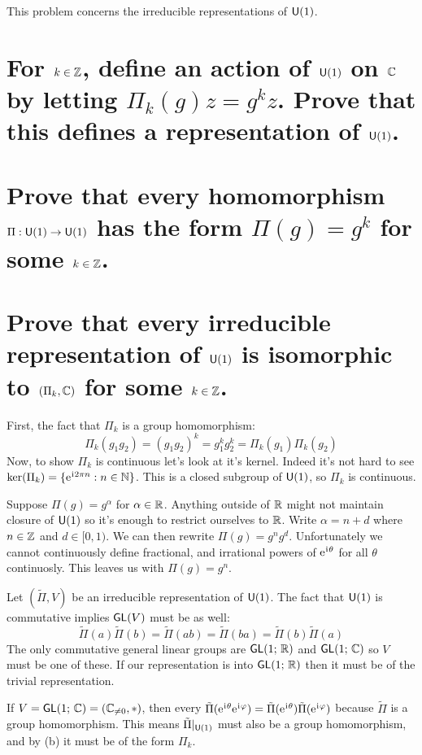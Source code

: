 \documentclass[
	pages,
	boxes,
	color=WildStrawberry
]{homework}
\begin{document}
\begin{problem}
This problem concerns the irreducible representations of $\mathsf{U}(1)$.
\begin{parts}
	\part{For $k \in \mathbb{Z}$, define an action of $\mathsf{U}(1)$ on $\mathbb{C}$ by letting $\Pi_k(g) z = g^k z$. Prove that this defines a representation of $\mathsf{U}(1)$.}\label{part:7a}
	\part{Prove that every homomorphism $\Pi: \mathsf{U}(1) \to \mathsf{U}(1)$ has the form $\Pi(g) = g^k$ for some $k \in \mathbb{Z}$.}\label{part:7b}
	\part{Prove that every irreducible representation of $\mathsf{U}(1)$ is isomorphic to $(\Pi_k, \mathbb{C})$ for some $k \in \mathbb{Z}$.}\label{part:7c}
\end{parts}
\end{problem}

\begin{solution}
	\ref{part:7a}
	First, the fact that $\Pi_k$ is a group homomorphism:
	\begin{equation*}
		\Pi_k(g_1 g_2) = (g_1 g_2)^k = g_1^k g_2^k = \Pi_k(g_1)\Pi_k(g_2)
	\end{equation*}
	Now, to show $\Pi_k$ is continuous let's look at it's kernel. Indeed it's not hard to see $\ker(\Pi_k) = \{\mathrm{e}^{\mkern1mu\mathrm{i}\mkern1mu 2\pi n} : n\in \mathbb{N} \}$. This is a closed subgroup of $\mathsf{U}(1)$, so $\Pi_k$ is continuous.

	\ref{part:7b}
	Suppose $\Pi(g) = g^\alpha$ for $\alpha\in\mathbb{R}$. Anything outside of $\mathbb{R}$ might not maintain closure of $\mathsf{U}(1)$ so it's enough to restrict ourselves to $\mathbb{R}$. Write $\alpha = n + d$ where $n\in\mathbb{Z}$ and $d\in[0, 1)$. We can then rewrite $\Pi(g) = g^n g^d$. Unfortunately we cannot continuously define fractional, and irrational powers of $\mathrm{e}^{\mkern1mu\mathrm{i}\mkern1mu \theta}$ for all $\theta$ continuosly. This leaves us with $\Pi(g) = g^n$.

	\ref{part:7c}
	Let $(\tilde{\Pi}, V)$ be an irreducible representation of $\mathsf{U}(1)$. The fact that $\mathsf{U}(1)$ is commutative implies $\mathsf{GL}(V)$ must be as well:
	\begin{equation*}
		\tilde{\Pi}(a)\tilde{\Pi}(b) = \tilde{\Pi}(ab) = \tilde{\Pi}(ba) = \tilde{\Pi}(b)\tilde{\Pi}(a)
	\end{equation*}
	The only commutative general linear groups are $\mathsf{GL}(1;\, \mathbb{R})$ and $\mathsf{GL}(1;\, \mathbb{C})$ so $V$ must be one of these. If our representation is into $\mathsf{GL}(1;\, \mathbb{R})$ then it must be of the trivial representation.

	If $V = \mathsf{GL}(1;\, \mathbb{C}) = (\mathbb{C}_{\neq 0}, *)$, then every $\tilde{\Pi}(\mathrm{e}^{\mkern1mu\mathrm{i}\mkern1mu \theta}\mathrm{e}^{\mkern1mu\mathrm{i}\mkern1mu \varphi}) = \tilde{\Pi}(\mathrm{e}^{\mkern1mu\mathrm{i}\mkern1mu \theta})\tilde{\Pi}(\mathrm{e}^{\mkern1mu\mathrm{i}\mkern1mu \varphi})$ because $\tilde{\Pi}$ is a group homomorphism. This means $\tilde{\Pi}|_{\mathsf{U}(1)}$ must also be a group homomorphism, and by (b) it must be of the form $\Pi_k$.
\end{solution}
\end{document}
